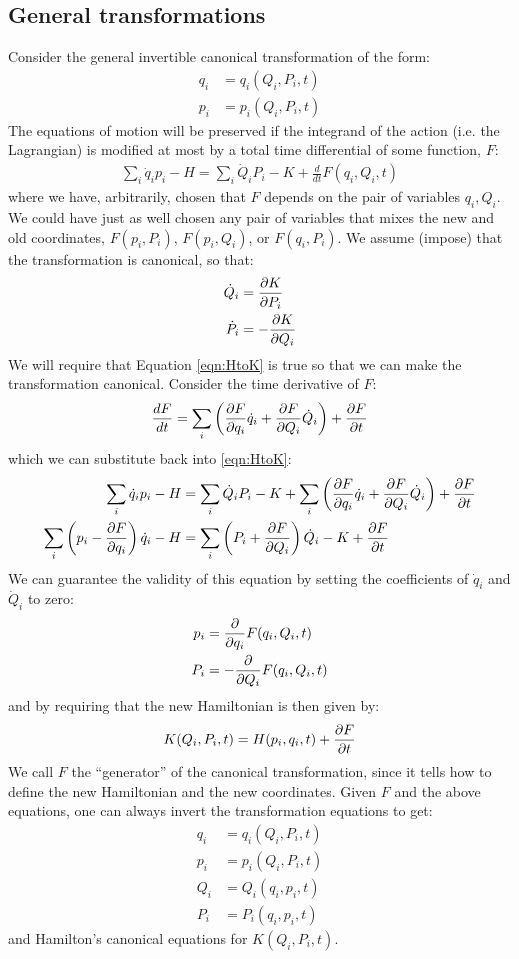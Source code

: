 \subsection{General transformations}
Consider the general invertible canonical transformation of the form:
\begin{align}
q_i&=q_i(Q_i,P_i,t)\nonumber\\
p_i&=p_i(Q_i,P_i,t)
\end{align}
The equations of motion will be preserved if the integrand of the action (i.e. the Lagrangian) is modified at most by a total time differential of some function, $F$:
\begin{align}
\sum_i\dot q_ip_i-H=\sum_i \dot Q_iP_i-K+\frac{d}{dt}F(q_i,Q_i,t)
\label{eqn:HtoK}
\end{align}
where we have, arbitrarily, chosen that $F$ depends on the pair of variables $q_i, Q_i$. We could have just as well chosen any pair of variables that mixes the new and old coordinates, $F(p_i, P_i)$, $F(p_i, Q_i)$, or $F(q_i, P_i)$. We assume (impose) that the transformation is canonical, so that:
\begin{align}
\dot Q_i&=\frac{\partial K}{\partial P_i}\nonumber\\
\dot P_i&=-\frac{\partial K}{\partial Q_i}
\end{align}
We will require that Equation \ref{eqn:HtoK} is true so that we can make the transformation canonical. Consider the time derivative of $F$:
\begin{align}
\frac{dF}{dt} =\sum_i\left(\frac{\partial F}{\partial q_i}\dot q_i+\frac{\partial F}{\partial Q_i}\dot Q_i\right)+\frac{\partial F}{\partial t}
\end{align}
which we can substitute back into \ref{eqn:HtoK}:
\begin{align}
\sum_i\dot q_ip_i-H&=\sum_i \dot Q_iP_i-K+\sum_i\left(\frac{\partial F}{\partial q_i}\dot q_i+\frac{\partial F}{\partial Q_i}\dot Q_i\right)+\frac{\partial F}{\partial t}\nonumber\\
\sum_i\left(p_i-\frac{\partial F}{\partial q_i}\right)\dot q_i-H&=\sum_i \left(P_i +\frac{\partial F}{\partial Q_i}\right)\dot Q_i-K+\frac{\partial F}{\partial t}
\end{align}
We can guarantee the validity of this equation by setting the coefficients of $\dot q_i$ and $\dot Q_i$ to zero:
\begin{align}
p_i&=\frac{\partial }{\partial q_i}F(q_i,Q_i,t)\nonumber\\
P_i&=-\frac{\partial }{\partial Q_i}F(q_i,Q_i,t)\nonumber\\
\end{align}
and by requiring that the new Hamiltonian is then given by:
\begin{align}
K(Q_i,P_i,t)=H(p_i,q_i,t)+\frac{\partial F}{\partial t}
\end{align}
We call $F$ the ``generator'' of the canonical transformation, since it tells how to define the new Hamiltonian and the new coordinates. Given $F$ and the above equations, one can always invert the transformation equations to get:
\begin{align}
q_i&=q_i(Q_i,P_i,t)\nonumber\\
p_i&=p_i(Q_i,P_i,t)\nonumber\\
Q_i&=Q_i(q_i,p_i,t)\nonumber\\
P_i&=P_i(q_i,p_i,t)
\end{align}
and Hamilton's canonical equations for $K(Q_i,P_i,t)$.

